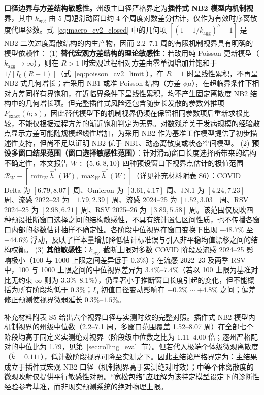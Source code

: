 \documentclass[11pt,a4paper]{article}
\theoremstyle{plain}
\theoremstyle{definition}
\begin{document}
\noindent\textbf{口径边界与方差结构敏感性。}州级主口径严格界定为\textbf{插件式 NB2 模型内机制视界}，其中 $k_{\text{agg}}$ 由 5 周短滑动窗口约 4 个周度对数差分估计，仅作为有效时序离散度代理参数。式~\eqref{eq:macro_cv2_closed} 中的几何项 $[(1+1/k_{\text{agg}})^h-1]$ 是 NB2 二次过度离散结构的内生产物，因而 2.2--7.1 周的有限机制视界具有明确的模型依赖性：
(1) \textbf{替代宏观方差结构的理论敏感性}：若改用纯 Poisson 更新模型（$k_{\text{agg}}\to\infty$），则在 $R>1$ 时宏观过程相对方差由零单调增加并饱和于 $1/[I_0(R-1)]$（式~\eqref{eq:poisson_cv2_limit}），在 $R=1$ 时呈线性累积，不再呈 NB2 式几何增长；若采用 NB1 或准 Poisson 结构（方差 $\phi \mu$），在超临界条件下相对方差同样有界饱和，在近临界条件下呈线性累积，均不产生固定离散度 NB2 结构中的几何增长项。但完整插件式风险还包含随步长发散的参数外推项 $P_{\text{exact}}(h; s)$，因此替代模型下的机制视界仍须在保留相同参数项后重新求根比较，不能仅根据过程方差的渐近饱和判定为无界。对数残差关于发病规模的经验散点显示方差可能随规模超线性增加，为采用 NB2 作为基准工作模型提供了初步描述性支持，但尚不足以证明 NB2 优于 NB1、动态离散度或状态空间模型。
(2) \textbf{预设多窗口结果范围（窗口选择敏感性范围）}：针对滑动窗口长度选择所带来的结构不确定性，本文报告 $W \in \{5, 6, 8, 10\}$ 四种预设窗口下视界点估计的极值范围 $\mathcal{R}_W \equiv [\min_{W} \hat{h}^*(W), \max_{W} \hat{h}^*(W)]$（详见补充材料附表 S6）：COVID Delta 为 $[6.79, 8.07]$ 周、Omicron 为 $[3.61, 4.17]$ 周、JN.1 为 $[4.24, 7.23]$ 周、流感 2022--23 为 $[1.79, 2.39]$ 周、流感 2024--25 为 $[1.52, 3.03]$ 周、RSV 2024--25 为 $[2.98, 6.21]$ 周、RSV 2025--26 为 $[3.89, 5.58]$ 周。该范围仅反映四种预设推断窗口选择之间的结构敏感性，不具有统计置信区间性质，也不传播各窗口内部的参数估计抽样不确定性。各阶段中位视界在窗口变换下出现 $-48.7\%$ 至 $+44.6\%$ 浮动，反映了样本量增加降低估计标准误与引入非平稳均值漂移之间的结构权衡。
(3) \textbf{其他敏感性}：$k_{\text{agg}}$ 截断上限对多数 COVID 阶段及流感 2024--25 影响极小（100 与 1000 上限之间差异低于 $0.3\%$）；在流感 2022--23 及两季 RSV 中，100 与 1000 上限之间的中位视界差异为 $3.4\%\text{--}7.4\%$（若以 100 上限为基准对比无约束 $\infty$ 则为 $3.3\%\text{--}8.1\%$），仍显著小于推断窗口长度引起的变化，但不能概括为所有阶段均低于 $0.3\%$；$I_0$ 初值口径变动影响在 $-0.2\%\sim +4.8\%$ 之间；偏差修正预测使视界微弱延长 $0.3\%$--$1.5\%$。

补充材料附表 S5 给出六个视界口径与实测时效的完整对照。插件式 NB2 模型内机制视界的州级中位数（2.2--7.1 周，多窗口范围覆盖 1.52--8.07 周）在全部七个阶段均高于同定义实测绝对视界（阶段级中位数之比为 1.11--4.00 倍；逐州严格配对的中位比为 1.79，见第~\ref{sec:rolling_eval} 节）。但若代入极端个体级微观离散度（$\hat{k}=0.111$），低计数阶段视界可降至实测之下。因此主结论严格界定为：主结果成立于插件式宏观 NB2 口径（机制视界高于实测绝对时效）；中等个体离散度的微观映射仅提供平行敏感性对照。“宽松包络”应理解为该特定模型设定下的诊断性经验参考基准，而非现实预测系统的绝对物理上限。
\end{document}
